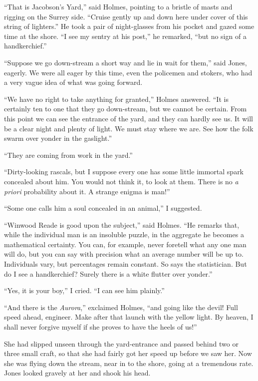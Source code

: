 \documentclass[12pt,english,oneside]{book}
\begin{document}
{}``That is Jacobson's Yard,'' said Holmes, pointing to a bristle
of masts and rigging on the Surrey side. {}``Cruise gently up and
down here under cover of this string of lighters.'' He took a pair
of night-glasses from his pocket and gazed some time at the shore.
{}``I see my sentry at his post,'' he remarked, {}``but no sign
of a handkerchief.''

{}``Suppose we go down-stream a short way and lie in wait for them,''
said Jones, eagerly. We were all eager by this time, even the policemen
and stokers, who had a very vague idea of what was going forward.

{}``We have no right to take anything for granted,'' Holmes answered.
{}``It is certainly ten to one that they go down-stream, but we cannot
be certain. From this point we can see the entrance of the yard, and
they can hardly see us. It will be a clear night and plenty of light.
We must stay where we are. See how the folk swarm over yonder in the
gaslight.''

{}``They are coming from work in the yard.''

{}``Dirty-looking rascals, but I suppose every one has some little
immortal spark concealed about him. You would not think it, to look
at them. There is no \emph{a priori} probability about it. A strange
enigma is man!''

{}``Some one calls him a soul concealed in an animal,'' I suggested.

{}``Winwood Reade is good upon the subject,'' said Holmes. {}``He
remarks that, while the individual man is an insoluble puzzle, in
the aggregate he becomes a mathematical certainty. You can, for example,
never foretell what any one man will do, but you can say with precision
what an average number will be up to. Individuals vary, but percentages
remain constant. So says the statistician. But do I see a handkerchief?
Surely there is a white flutter over yonder.''

{}``Yes, it is your boy,'' I cried. {}``I can see him plainly.''

{}``And there is the \emph{Aurora},'' exclaimed Holmes, {}``and
going like the devil! Full speed ahead, engineer. Make after that
launch with the yellow light. By heaven, I shall never forgive myself
if she proves to have the heels of us!''

She had slipped unseen through the yard-entrance and passed behind
two or three small craft, so that she had fairly got her speed up
before we saw her. Now she was flying down the stream, near in to
the shore, going at a tremendous rate. Jones looked gravely at her
and shook his head.
\end{document}

